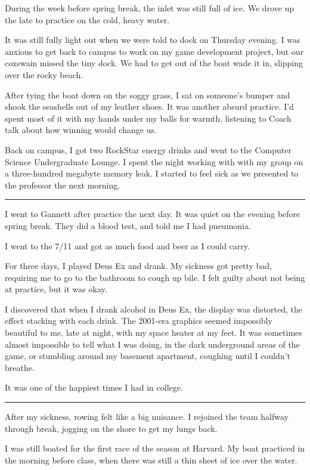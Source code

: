 During the week before spring break, the inlet was still full of ice.  We drove
up the late to practice on the cold, heavy water. 

It was still fully light out when we were told to dock on Thursday evening.  I
was anxious to get back to campus to work on my game development project, but
our coxswain missed the tiny dock.  We had to get out of the boat wade it in,
slipping over the rocky beach.

After tying the boat down on the soggy grass, I sat on someone's bumper and
shook the seashells out of my leather shoes.  It was another absurd practice.
I'd spent most of it with my hands under my balls for warmth, listening to Coach
talk about how winning would change us.  

Back on campus, I got two RockStar energy drinks and went to the Computer
Science Undergraduate Lounge.  I spent the night working with with my group on a
three-hundred megabyte memory leak.  I started to feel sick as we presented to
the professor the next morning.

\plainfancybreak{12pt}{2}{}

I went to Gannett after practice the next day.  It was quiet on the evening
before spring break.  They did a blood test, and told me I had pneumonia.

I went to the 7/11 and got as much food and beer as I could carry.  

For three days, I played Deus Ex and drank.  My sickness got pretty bad,
requiring me to go to the bathroom to cough up bile.  I felt guilty about not
being at practice, but it was okay.   

I discovered that when I drank alcohol in Deus Ex, the display was distorted,
the effect stacking with each drink.  The 2001-era graphics seemed impossibly
beautiful to me, late at night, with my space heater at my feet.  It was
sometimes almost impossible to tell what I was doing, in the dark underground
areas of the game, or stumbling around my basement apartment, coughing until I
couldn't breathe.

It was one of the happiest times I had in college.

\plainfancybreak{12pt}{2}{}

After my sickness, rowing felt like a big nuisance.  I rejoined the team halfway
through break, jogging on the shore to get my lungs back.  

I was still boated for the first race of the season at Harvard.  My boat
practiced in the morning before class, when there was still a thin sheet of ice
over the water.

